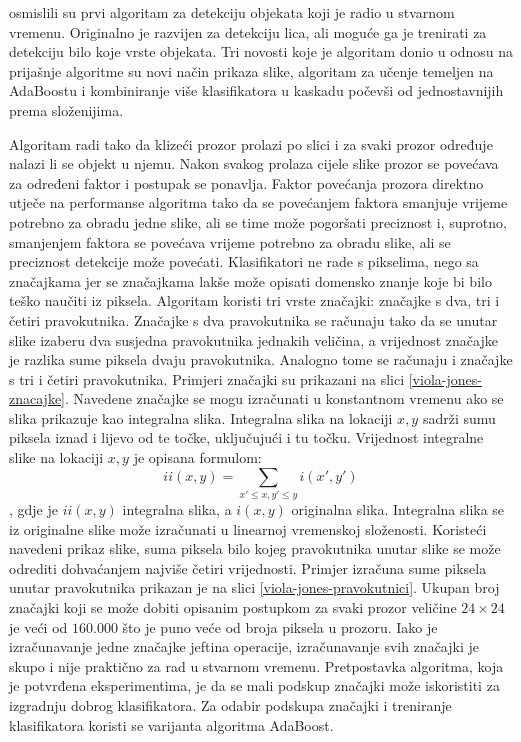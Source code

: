 \cite{Viola01rapidobject} osmislili su prvi algoritam za detekciju objekata koji je radio u stvarnom vremenu. Originalno je razvijen za detekciju lica, ali moguće ga je trenirati za detekciju bilo koje vrste objekata. Tri novosti koje je algoritam donio u odnosu na prijašnje algoritme su novi način prikaza slike, algoritam za učenje temeljen na AdaBoostu i kombiniranje više klasifikatora u kaskadu počevši od jednostavnijih prema složenijima.

Algoritam radi tako da klizeći prozor prolazi po slici i za svaki prozor određuje nalazi li se objekt u njemu. Nakon svakog prolaza cijele slike prozor se povećava za određeni faktor i postupak se ponavlja. Faktor povećanja prozora direktno utječe na performanse algoritma tako da se povećanjem faktora smanjuje vrijeme potrebno za obradu jedne slike, ali se time može pogoršati preciznost i, suprotno, smanjenjem faktora se povećava vrijeme potrebno za obradu slike, ali se preciznost detekcije može povećati.
Klasifikatori ne rade s pikselima, nego sa značajkama jer se značajkama lakše može opisati domensko znanje koje bi bilo teško naučiti iz piksela. Algoritam koristi tri vrste značajki: značajke s dva, tri i četiri pravokutnika. Značajke s dva pravokutnika se računaju tako da se unutar slike izaberu dva susjedna pravokutnika jednakih veličina, a vrijednost značajke je razlika sume piksela dvaju pravokutnika. Analogno tome se računaju i značajke s tri i četiri pravokutnika. Primjeri značajki su prikazani na slici \ref{viola-jones-znacajke}.
Navedene značajke se mogu izračunati u konstantnom vremenu ako se slika prikazuje kao integralna slika. Integralna slika na lokaciji $x, y$ sadrži sumu piksela iznad i lijevo od te točke, uključujući i tu točku. Vrijednost integralne slike na lokaciji $x, y$ je opisana formulom:
\[
	ii(x, y) = \sum\limits_{x' \leq x, y' \leq y} i(x', y')
\]
, gdje je $ii(x, y)$ integralna slika, a $i(x, y)$ originalna slika. Integralna slika se iz originalne slike može izračunati u linearnoj vremenskoj složenosti. Koristeći navedeni prikaz slike, suma piksela bilo kojeg pravokutnika unutar slike se može odrediti dohvaćanjem najviše četiri vrijednosti. Primjer izračuna sume piksela unutar pravokutnika prikazan je na slici \ref{viola-jones-pravokutnici}. Ukupan broj značajki koji se može dobiti opisanim postupkom za svaki prozor veličine $24 \times 24$ je veći od $160.000$ što je puno veće od broja piksela u prozoru. Iako je izračunavanje jedne značajke jeftina operacije, izračunavanje svih značajki je skupo i nije praktično za rad u stvarnom vremenu. Pretpostavka algoritma, koja je potvrđena eksperimentima, je da se mali podskup značajki može iskoristiti za izgradnju dobrog klasifikatora. Za odabir podskupa značajki i treniranje klasifikatora koristi se varijanta algoritma AdaBoost.

